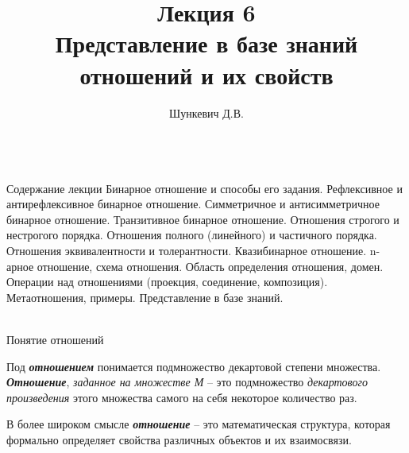 \title{Лекция 6\\Представление в базе знаний отношений и их свойств}   
\author[]{Шункевич Д.В.}

\begin{frame}
	\titlepage
\end{frame}

\begin{frame}{\\Содержание лекции}
	\topline
	\justifying
	Бинарное отношение и способы его задания. Рефлексивное и антирефлексивное бинарное отношение. Симметричное и антисимметричное бинарное отношение. Транзитивное бинарное отношение. Отношения строгого и нестрогого порядка. Отношения полного (линейного) и частичного порядка. Отношения эквивалентности и толерантности. Квазибинарное отношение. n-арное отношение, схема отношения. Область определения отношения, домен. Операции над отношениями (проекция, соединение, композиция). Метаотношения, примеры. Представление в базе знаний.
\end{frame}

\begin{frame}{\\Понятие отношений}
	\topline
	\justifying
	
	Под \textbf{\textit{отношением}} понимается подмножество декартовой степени множества.\\
	
	\textbf{\textit{Отношение}}, \textit{заданное на множестве М} -- это подмножество \textit{декартового произведения} этого множества самого на себя некоторое количество раз.\\
	
	
	
	В более широком смысле {\textbf{\textit{отношение}}} -- это математическая структура, которая формально определяет свойства различных объектов и их взаимосвязи.
\end{frame}

